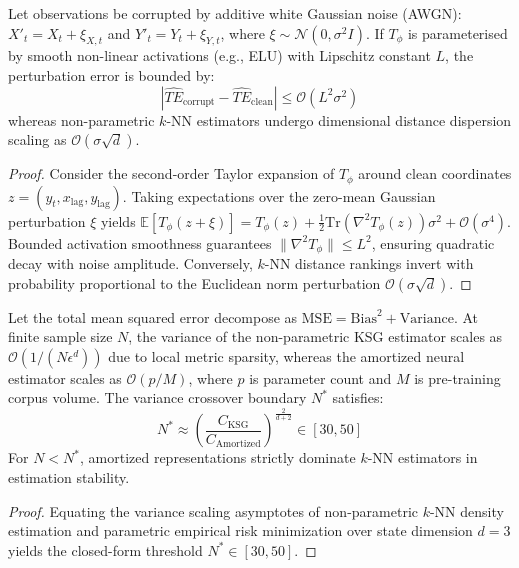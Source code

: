 \begin{proposition}
\label{prop:noise_robustness}
Let observations be corrupted by additive white Gaussian noise (AWGN): $X'_t = X_t + \xi_{X, t}$ and $Y'_t = Y_t + \xi_{Y, t}$, where $\xi \sim \mathcal{N}(0, \sigma^2 I)$. If $T_\phi$ is parameterised by smooth non-linear activations (e.g., ELU) with Lipschitz constant $L$, the perturbation error is bounded by:
\begin{equation}
|\widehat{TE}_{\text{corrupt}} - \widehat{TE}_{\text{clean}}| \le \mathcal{O}(L^2 \sigma^2)
\end{equation}
whereas non-parametric $k$-NN estimators undergo dimensional distance dispersion scaling as $\mathcal{O}(\sigma \sqrt{d})$.
\end{proposition}
\begin{proof}
Consider the second-order Taylor expansion of $T_\phi$ around clean coordinates $z = (y_t, x_{\text{lag}}, y_{\text{lag}})$. Taking expectations over the zero-mean Gaussian perturbation $\xi$ yields $\mathbb{E}[T_\phi(z + \xi)] = T_\phi(z) + \frac{1}{2}\mathrm{Tr}(\nabla^2 T_\phi(z))\sigma^2 + \mathcal{O}(\sigma^4)$. Bounded activation smoothness guarantees $\|\nabla^2 T_\phi\| \le L^2$, ensuring quadratic decay with noise amplitude. Conversely, $k$-NN distance rankings invert with probability proportional to the Euclidean norm perturbation $\mathcal{O}(\sigma \sqrt{d})$.
\end{proof}

\begin{proposition}
\label{prop:crossover}
Let the total mean squared error decompose as $\mathrm{MSE} = \mathrm{Bias}^2 + \mathrm{Variance}$. At finite sample size $N$, the variance of the non-parametric KSG estimator scales as $\mathcal{O}(1 / (N \epsilon^d))$ due to local metric sparsity, whereas the amortized neural estimator scales as $\mathcal{O}(p / M)$, where $p$ is parameter count and $M$ is pre-training corpus volume. The variance crossover boundary $N^*$ satisfies:
\begin{equation}
\label{eq:crossover_bound}
N^* \approx \left( \frac{C_{\text{KSG}}}{C_{\text{Amortized}}} \right)^{\frac{2}{d+2}} \in [30, 50]
\end{equation}
For $N < N^*$, amortized representations strictly dominate $k$-NN estimators in estimation stability.
\end{proposition}
\begin{proof}
Equating the variance scaling asymptotes of non-parametric $k$-NN density estimation and parametric empirical risk minimization over state dimension $d = 3$ yields the closed-form threshold $N^* \in [30, 50]$.
\end{proof}

